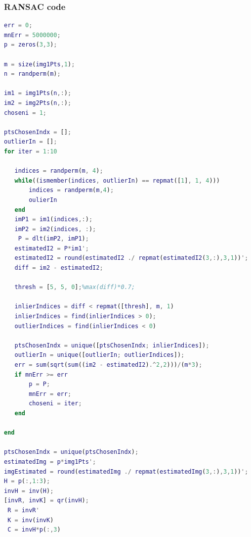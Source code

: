 \documentclass[12pt]{article}
\begin{document}
\subsubsection{RANSAC code}
\begin{lstlisting}[language=matlab]
err = 0;
mnErr = 5000000;
p = zeros(3,3);

m = size(img1Pts,1);
n = randperm(m);

im1 = img1Pts(n,:);
im2 = img2Pts(n,:);
choseni = 1;

ptsChosenIndx = [];
outlierIn = [];
for iter = 1:10
    
   indices = randperm(m, 4);
   while((ismember(indices, outlierIn) == repmat([1], 1, 4)))
       indices = randperm(m,4);
       oulierIn
   end
   imP1 = im1(indices,:);
   imP2 = im2(indices, :);
    P = dlt(imP2, imP1);
   estimatedI2 = P*im1';
   estimatedI2 = round(estimatedI2 ./ repmat(estimatedI2(3,:),3,1))';
   diff = im2 - estimatedI2;
   
   thresh = [5, 5, 0];%max(diff)*0.7;
  
   inlierIndices = diff < repmat([thresh], m, 1)
   inlierIndices = find(inlierIndices > 0);
   outlierIndices = find(inlierIndices < 0)

   ptsChosenIndx = unique([ptsChosenIndx; inlierIndices]);
   outlierIn = unique([outlierIn; outlierIndices]);
   err = sum(sqrt(sum((im2 - estimatedI2).^2,2)))/(m*3);
   if mnErr >= err
       p = P;
       mnErr = err;
       choseni = iter;
   end
   
end

ptsChosenIndx = unique(ptsChosenIndx);
estimatedImg = p*img1Pts';
imgEstimated = round(estimatedImg ./ repmat(estimatedImg(3,:),3,1))';
H = p(:,1:3);
invH = inv(H);
[invR, invK] = qr(invH);
 R = invR'
 K = inv(invK)
 C = invH*p(:,3)

 
\end{lstlisting}
\end{document}
